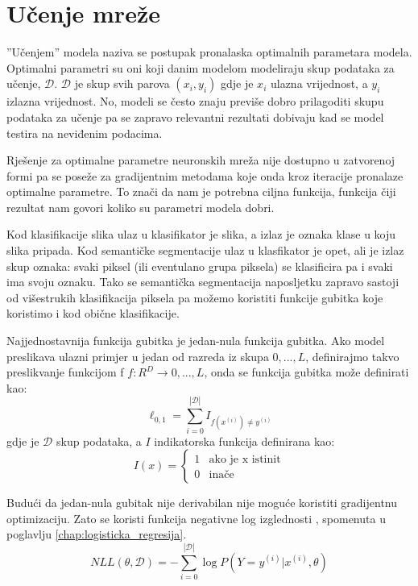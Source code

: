 \documentclass[times, utf8, diplomski, numeric]{fer}
\newcommand{\abs}[1]{\left\lvert#1\right\rvert}
\begin{document}
\chapter{Učenje mreže}

''Učenjem'' modela naziva se postupak pronalaska optimalnih parametara modela. Optimalni parametri su oni koji danim modelom modeliraju skup podataka za učenje, $\mathcal{D}$. $\mathcal{D}$ je skup svih parova $(x_i, y_i)$ gdje je $x_i$ ulazna vrijednost, a $y_i$ izlazna vrijednost. No, modeli se često znaju previše dobro prilagoditi skupu podataka za učenje pa se zapravo relevantni rezultati dobivaju kad se model testira na neviđenim podacima.

Rješenje za optimalne parametre neuronskih mreža nije dostupno u zatvorenoj formi pa se poseže za gradijentnim metodama koje onda kroz iteracije pronalaze optimalne parametre. To znači da nam je potrebna ciljna funkcija, funkcija čiji rezultat nam govori koliko su parametri modela dobri.

Kod klasifikacije slika ulaz u klasifikator je slika, a izlaz je oznaka klase u koju slika pripada. Kod semantičke segmentacije ulaz u klasfikator je opet, ali je izlaz skup oznaka: svaki piksel (ili eventulano grupa piksela) se klasificira pa i svaki ima svoju oznaku. Tako se semantička segmentacija naposljetku zapravo sastoji od višestrukih klasifikacija piksela pa možemo koristiti funkcije gubitka koje koristimo i kod obične klasifikacije.

Najjednostavnija funkcija gubitka je jedan-nula funkcija gubitka. Ako model preslikava ulazni primjer u jedan od razreda iz skupa ${0, ..., L}$, definirajmo takvo preslikvanje funkcijom f $f: R^D \rightarrow {0, ..., L}$, onda se funkcija gubitka može definirati kao:
\begin{equation}
\ell_{0, 1} = \sum_{i = 0}^{\abs{\mathcal{D}}} I_{f(x^{(i)}) \neq y^{(i)}}
\end{equation}
gdje je $\mathcal{D}$ skup podataka, a $I$ indikatorska funkcija definirana kao:
\begin{equation}
I(x) =
    \left\{
	    \begin{array}{ll}
		    1  & \mbox{ako je x istinit} \\
		    0  & \mbox{inače}
	    \end{array}
    \right.
\end{equation}

Budući da jedan-nula gubitak nije derivabilan nije moguće koristiti gradijentnu optimizaciju. Zato se koristi funkcija negativne log izglednosti , spomenuta u poglavlju \ref{chap:logisticka_regresija}.
\begin{equation}
NLL(\theta, \mathcal{D}) = - \sum_{i = 0}^{\abs{\mathcal{D}}} \log P(Y = y^{(i)} | x^{(i)}, \theta)
\end{equation}
\end{document}

